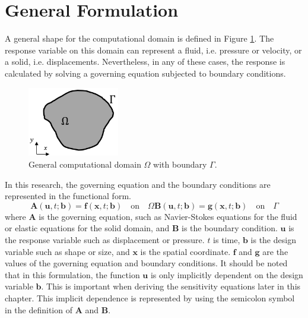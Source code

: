 \section{General Formulation}
A general shape for the computational domain is defined in Figure \ref{fig:C2_continuumDomain}. The response variable on this domain can represent a fluid, i.e. pressure or velocity, or a solid, i.e. displacements. Nevertheless, in any of these cases, the response is calculated by solving a governing equation subjected to boundary conditions. 
%
\begin{figure}
    \centering
    \includegraphics[width=4.00cm]{Chapter_2/figure/general_domain.png}
    \caption{General computational domain $\Omega$ with boundary $\Gamma$.}
    \label{fig:C2_continuumDomain}
\end{figure}
%
In this research, the governing equation and the boundary conditions are represented in the functional form.
%
\begin{subequations}\label{eq:C2_governingEquationAndBC}
\begin{equation}\label{eq:C2_generalGoverningEquation}
    \mathbf{A}(\mathbf{u}, t; \mathbf{b}) = \mathbf{f}(\mathbf{x}, t; \mathbf{b})
    \quad \text{on} \quad \Omega
\end{equation}
\begin{equation}\label{eq:C2_generalBoundaryCondition}
    \mathbf{B}(\mathbf{u}, t; \mathbf{b}) = \mathbf{g}(\mathbf{x}, t; \mathbf{b})    
    \quad \text{on} \quad \Gamma
\end{equation}
\end{subequations}
%
where $\mathbf{A}$ is the governing equation, such as Navier-Stokes equations for the fluid or elastic equations for the solid domain, and $\mathbf{B}$ is the boundary condition. $\mathbf{u}$ is the response variable such as displacement or pressure. $t$ is time, $\mathbf{b}$ is the design variable such as shape or size, and $\mathbf{x}$ is the spatial coordinate. $\mathbf{f}$ and $\mathbf{g}$ are the values of the governing equation and boundary conditions. It should be noted that in this formulation, the function $\mathbf{u}$ is only implicitly dependent on the design variable $\mathbf{b}$. This is important when deriving the sensitivity equations later in this chapter. This implicit dependence is represented by using the semicolon symbol in the definition of $\mathbf{A}$ and $\mathbf{B}$.

